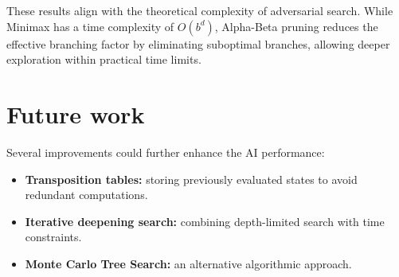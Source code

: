 \documentclass[a4paper,11pt]{article}
\begin{document}
These results align with the theoretical complexity of adversarial search. While Minimax has a time complexity of $O(b^d)$, Alpha-Beta pruning reduces the effective branching factor by eliminating suboptimal branches, allowing deeper exploration within practical time limits.


\section{Future work}
Several improvements could further enhance the AI performance:
\begin{itemize}
\item \textbf{Transposition tables:} storing previously evaluated states to avoid redundant computations.
\item \textbf{Iterative deepening search:} combining depth-limited search with time constraints.
\item \textbf{Monte Carlo Tree Search:} an alternative algorithmic approach.
\end{itemize}
\end{document}
